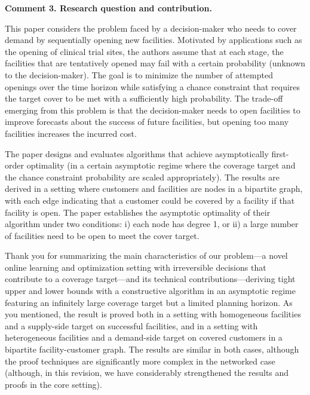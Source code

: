 \documentclass[11pt]{article}
\begin{document}
\begin{commentBox}
\textbf{Comment 3. Research question and contribution.}\label{R1:3}

    This paper considers the problem faced by a decision-maker who needs to cover demand by sequentially opening new facilities. Motivated by applications such as the opening of clinical trial sites, the authors assume that at each stage, the facilities that are tentatively opened may fail with a certain probability (unknown to the decision-maker). The goal is to minimize the number of attempted openings over the time horizon while satisfying a chance constraint that requires the target cover to be met with a sufficiently high probability. The trade-off emerging from this problem is that the decision-maker needs to open facilities to improve forecasts about the success of future facilities, but opening too many facilities increases the incurred cost.

    The paper designs and evaluates algorithms that achieve asymptotically first-order optimality (in a certain asymptotic regime where the coverage target and the chance constraint probability are scaled appropriately). The results are derived in a setting where customers and facilities are nodes in a bipartite graph, with each edge indicating that a customer could be covered by a facility if that facility is open. The paper establishes the asymptotic optimality of their algorithm under two conditions: i) each node has degree 1, or ii) a large number of facilities need to be open to meet the cover target.
\end{commentBox}

Thank you for summarizing the main characteristics of our problem---a novel online learning and optimization setting with irreversible decisions that contribute to a coverage target---and its technical contributions---deriving tight upper and lower bounds with a constructive algorithm in an asymptotic regime featuring an infinitely large coverage target but a limited planning horizon. As you mentioned, the result is proved both in a setting with homogeneous facilities and a supply-side target on successful facilities, and in a setting with heterogeneous facilities and a demand-side target on covered customers in a bipartite facility-customer graph. The results are similar in both cases, although the proof techniques are significantly more complex in the networked case (although, in this revision, we have considerably strengthened the results and proofs in the core setting).
\end{document}
